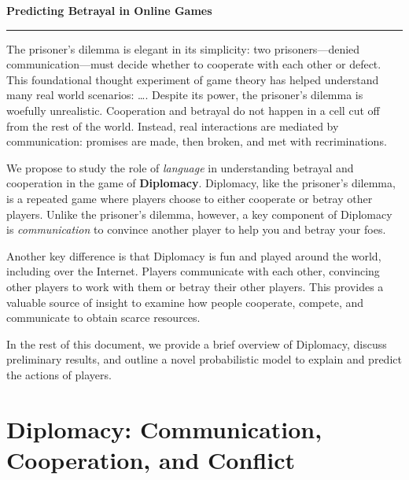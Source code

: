 \documentclass[11pt,letterpaper]{article}
\begin{document}
\begin{center}
{\bf Predicting Betrayal in Online Games}
\noindent\rule{2cm}{0.4pt}
\end{center}

The prisoner's dilemma is elegant in its simplicity: two
prisoners---denied communication---must decide whether to cooperate
with each other or defect.  This foundational thought experiment of
game theory has helped understand many real world scenarios: \dots .
Despite its power, the prisoner's dilemma is woefully unrealistic.
Cooperation and betrayal do not happen in a cell cut off from the rest
of the world.  Instead, real interactions are mediated by
communication: promises are made, then broken, and met with
recriminations.

We propose to study the role of \emph{language} in understanding
betrayal and cooperation in the game of {\bf Diplomacy}.  Diplomacy,
like the prisoner's dilemma, is a repeated game where players choose
to either cooperate or betray other players.  Unlike the prisoner's
dilemma, however, a key component of Diplomacy is \emph{communication}
to convince another player to help you and betray your foes.

Another key difference is that Diplomacy is fun and played around the
world, including over the Internet.  Players communicate with each
other, convincing other players to work with them or betray their
other players.  This provides a valuable source of insight to examine
how people cooperate, compete, and communicate to obtain scarce
resources.

In the rest of this document, we provide a brief overview of
Diplomacy, discuss preliminary results, and outline a novel
probabilistic model to explain and predict the actions of players.

\section{Diplomacy: Communication, Cooperation, and Conflict}
\end{document}
